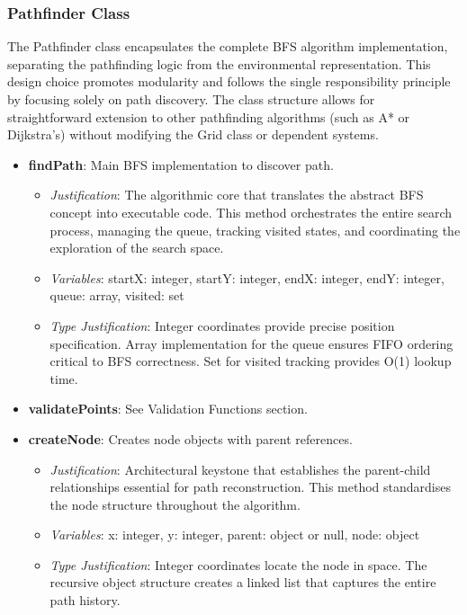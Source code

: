 \newpage

\subsubsection*{Pathfinder Class}
The Pathfinder class encapsulates the complete BFS algorithm implementation, separating the pathfinding logic from the environmental representation. This design choice promotes modularity and follows the single responsibility principle by focusing solely on path discovery. The class structure allows for straightforward extension to other pathfinding algorithms (such as A* or Dijkstra's) without modifying the Grid class or dependent systems.

\begin{itemize}
  \item \textbf{findPath}: Main BFS implementation to discover path.
    \begin{itemize}
      \item \textit{Justification}: The algorithmic core that translates the abstract BFS concept into executable code. This method orchestrates the entire search process, managing the queue, tracking visited states, and coordinating the exploration of the search space.
      \item \textit{Variables}: startX: integer, startY: integer, endX: integer, endY: integer, queue: array, visited: set
      \item \textit{Type Justification}: Integer coordinates provide precise position specification. Array implementation for the queue ensures FIFO ordering critical to BFS correctness. Set for visited tracking provides O(1) lookup time.
    \end{itemize}
    
  \item \textbf{validatePoints}: See Validation Functions section.
  
  \item \textbf{createNode}: Creates node objects with parent references.
    \begin{itemize}
      \item \textit{Justification}: Architectural keystone that establishes the parent-child relationships essential for path reconstruction. This method standardises the node structure throughout the algorithm.
      \item \textit{Variables}: x: integer, y: integer, parent: object or null, node: object
      \item \textit{Type Justification}: Integer coordinates locate the node in space. The recursive object structure creates a linked list that captures the entire path history.
    \end{itemize}
    

\end{itemize}
